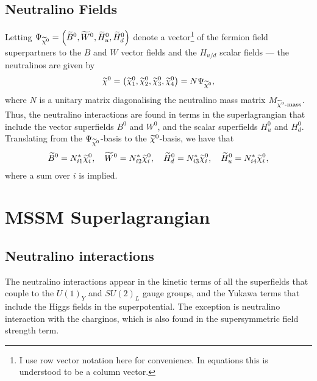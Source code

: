 \documentclass[english, notitlepage]{article}
\begin{document}
    \subsection{Neutralino Fields}
        Letting $\Psi_{\nino} = \pclosed{\bino, \wino, \hinou, \hinod}$ denote a
        vector\footnote{I use row vector notation here for convenience. In equations
            this is understood to be a column vector.} of the fermion field superpartners
        to the $B$ and $W$ vector fields and the $H_{u/d}$ scalar fields --- the
        neutralinos are given by
        \begin{align}
            \nino = \pclosed{\nino[1], \nino[2], \nino[3], \nino[4]} = N \Psi_{\nino},
        \end{align}
        where $N$ is a unitary matrix diagonalising the neutralino mass matrix $M_{\nino\text{-mass}}$. Thus, the neutralino interactions are found in terms in the superlagrangian that include the vector superfields $B^0$ and $W^0$, and the scalar superfields $H_u^0$ and $H_d^0$. Translating from the $\Psi_{\nino}$-basis to the $\nino$-basis, we have that
        \begin{align}
            \bino = N_{i1}^* \nino[i],\quad \wino = N_{i2}^* \nino[i],\quad \hinod = N_{i3}^* \nino[i],\quad \hinou = N_{i4}^* \nino[i],
        \end{align}
        where a sum over $i$ is implied.

\section{MSSM Superlagrangian}

    \subsection{Neutralino interactions}
        The neutralino interactions appear in the kinetic terms of all the superfields
        that couple to the $U(1)_Y$ and $SU(2)_L$ gauge groups, and the Yukawa terms
        that include the Higgs fields in the superpotential. The exception is neutralino interaction with the charginos, which is also found in the supersymmetric field strength term.
\end{document}
